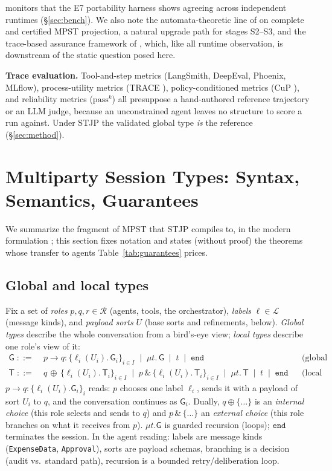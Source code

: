 \documentclass{article}
\newcommand{\gtG}{\mathsf{G}}
\newcommand{\lt}{\mathsf{T}}
\newcommand{\ed}{\mathtt{end}}
\newcommand{\sends}{\rightarrow}
\newcommand{\lbl}{\ell}
\newcommand{\stjp}{\textsc{STJP}}
\begin{document}
monitors that the E7 portability harness shows agreeing across independent runtimes (\S\ref{sec:bench}). We also note the automata-theoretic line of \citet{listutz23,li25oopsla,liwies25} on complete and certified MPST projection, a natural upgrade path for stages S2--S3, and the trace-based assurance framework of \citet{paduraru26}, which, like all runtime observation, is downstream of the static question posed here.

\textbf{Trace evaluation.} Tool-and-step metrics (LangSmith, DeepEval, Phoenix, MLflow), process-utility metrics (TRACE \citep{trace}), policy-conditioned metrics (CuP \citep{stweb}), and reliability metrics ($\mathrm{pass}^k$) all presuppose a hand-authored reference trajectory or an LLM judge, because an unconstrained agent leaves no structure to score a run against. Under \stjp{} the validated global type \emph{is} the reference (\S\ref{sec:method}).

\section{Multiparty Session Types: Syntax, Semantics, Guarantees}\label{sec:mpst}
We summarize the fragment of MPST that \stjp{} compiles to, in the modern formulation \citep{hyc08,scalas19}; this section fixes notation and states (without proof) the theorems whose transfer to agents Table~\ref{tab:guarantees} prices.

\subsection{Global and local types}
Fix a set of \emph{roles} $p,q,r\in\mathcal{R}$ (agents, tools, the orchestrator), \emph{labels} $\lbl\in\mathcal{L}$ (message kinds), and \emph{payload sorts} $U$ (base sorts and refinements, below). \emph{Global types} describe the whole conversation from a bird's-eye view; \emph{local types} describe one role's view of it:
\begin{align*}
\gtG \;::=\;& p \sends q : \{\lbl_i(U_i).\,\gtG_i\}_{i\in I} \;\mid\; \mu t.\,\gtG \;\mid\; t \;\mid\; \ed
&& \text{(global types)}\\
\lt \;::=\;& q\,{\oplus}\,\{\lbl_i(U_i).\,\lt_i\}_{i\in I} \;\mid\; p\,\&\,\{\lbl_i(U_i).\,\lt_i\}_{i\in I} \;\mid\; \mu t.\,\lt \;\mid\; t \;\mid\; \ed
&& \text{(local types)}
\end{align*}
$p \sends q:\{\lbl_i(U_i).\gtG_i\}_{i}$ reads: $p$ chooses one label $\lbl_i$, sends it with a payload of sort $U_i$ to $q$, and the conversation continues as $\gtG_i$. Dually, $q\oplus\{\ldots\}$ is an \emph{internal choice} (this role selects and sends to $q$) and $p\,\&\,\{\ldots\}$ an \emph{external choice} (this role branches on what it receives from $p$). $\mu t.\gtG$ is guarded recursion (loops); $\ed$ terminates the session. In the agent reading: labels are message kinds (\texttt{ExpenseData}, \texttt{Approval}), sorts are payload schemas, branching is a decision (audit vs.\ standard path), recursion is a bounded retry/deliberation loop.
\end{document}
